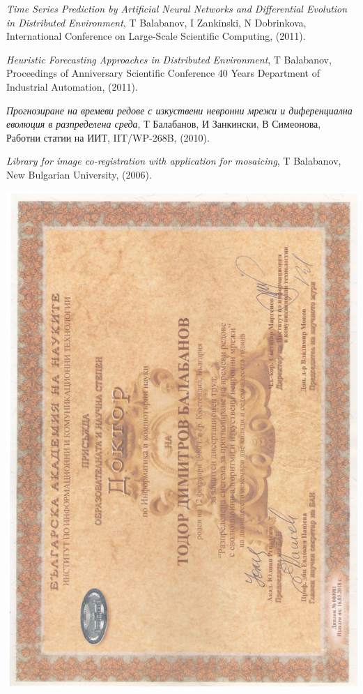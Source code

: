 \documentclass[bulgarian,a4paper]{europasscv}
\begin{document}
\begin{europasscv}
{\begin{ecvitemize}
    \item \textit{Time Series Prediction by Artificial Neural Networks and Differential Evolution in Distributed Environment}, T Balabanov, I Zankinski, N Dobrinkova, International Conference on Large-Scale Scientific Computing, (2011).
    \item \textit{Heuristic Forecasting Approaches in Distributed Environment}, T Balabanov, Proceedings of Anniversary Scientific Conference 40 Years Department of Industrial Automation, (2011).
    \item \textit{Прогнозиране на времеви редове с изкуствени невронни мрежи и диференциална еволюция в разпределена среда}, Т Балабанов, И Занкински, В Симеонова, Работни статии на ИИТ, IIT/WP-268B, (2010).
    \item \textit{Library for image co-registration with application for mosaicing}, T Balabanov, New Bulgarian University, (2006).
  \end{ecvitemize}}
  
  \end{europasscv}

\includegraphics[width=\textwidth,height=\textheight,keepaspectratio]{DiplomaIICT2018}
\end{document}

